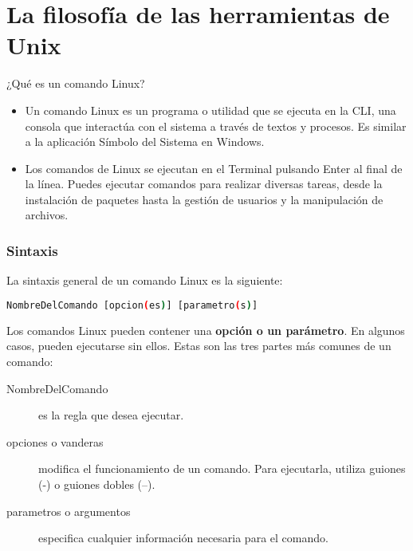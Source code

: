 

\section{La filosofía de las herramientas de Unix}

\begin{frame}[c]{¿Qué es un comando Linux?}
  \begin{itemize}
    \item Un comando Linux es un programa o utilidad que se ejecuta en la CLI,
      una consola que interactúa con el sistema a través de textos y procesos.
      Es similar a la aplicación Símbolo del Sistema en Windows.
    \item Los comandos de Linux se ejecutan en el Terminal pulsando Enter al
      final de la línea. Puedes ejecutar comandos para realizar diversas
      tareas, desde la instalación de paquetes hasta la gestión de usuarios
      y la manipulación de archivos.
  \end{itemize}
\end{frame}

\begin{frame}[fragile]
  \frametitle{Sintaxis}
  La sintaxis general de un comando Linux es la siguiente:

  \begin{lstlisting}[language=Bash]
NombreDelComando [opcion(es)] [parametro(s)]
  \end{lstlisting}

  \vspace{\baselineskip}
  Los comandos Linux pueden contener una \textbf{opción o un parámetro}.
  En algunos casos, pueden ejecutarse sin ellos. Estas son las tres partes
  más comunes de un comando:

  \vspace{\baselineskip}
  \begin{description}
    \item [NombreDelComando] es la regla que desea ejecutar.
    \item [opciones o vanderas] modifica el funcionamiento de un comando.
      Para ejecutarla, utiliza guiones (-) o guiones dobles (--).
    \item [parametros o argumentos] especifica cualquier información
      necesaria para el comando.
  \end{description}
\end{frame}

